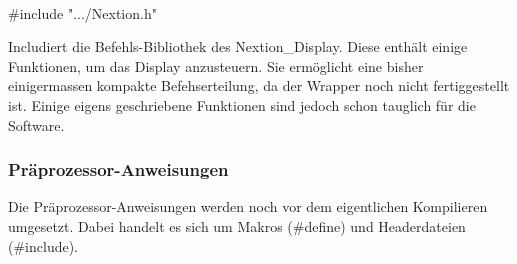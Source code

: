 \begin{tabbing}
{}\\

\parbox[t]{.3\textwidth}{

\#include ".../Nextion.h"

} \>\parbox[t]{.7\textwidth}{

Includiert die Befehls-Bibliothek des Nextion\_Display. Diese enthält einige Funktionen, um das Display anzusteuern. Sie ermöglicht eine bisher einigermassen kompakte Befehserteilung, da der Wrapper noch nicht fertiggestellt ist. Einige eigens geschriebene Funktionen sind jedoch schon tauglich für die Software.

}
\end{tabbing}

\subsubsection{Präprozessor-Anweisungen}\label{subsubsec:Präprozessor-Anweisungen}

Die Präprozessor-Anweisungen werden noch vor dem eigentlichen Kompilieren umgesetzt. Dabei handelt es sich um Makros (\#define) und Headerdateien (\#include).


